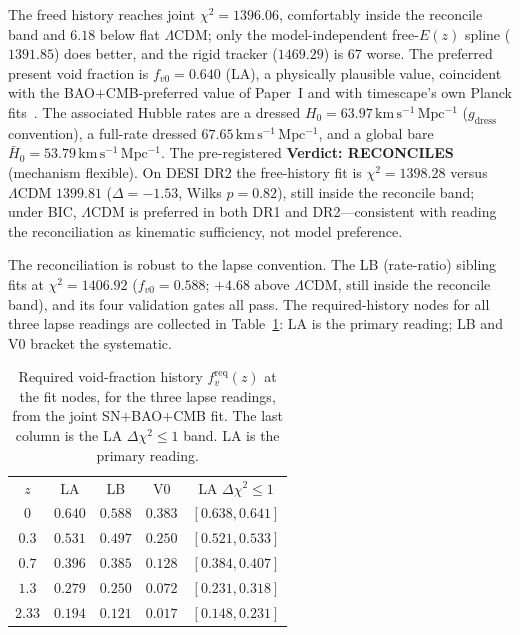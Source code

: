 \documentclass[aps,prd,twocolumn,nofootinbib,superscriptaddress,floatfix]{revtex4-2}
\newcommand{\Ho}{H_{0}}
\newcommand{\Hbaro}{\bar H_{0}}
\newcommand{\fvo}{f_{v0}}
\newcommand{\kmsmpc}{\,\mathrm{km\,s^{-1}\,Mpc^{-1}}}
\newcommand{\Lcdm}{\Lambda\mathrm{CDM}}
\newcommand{\gdress}{g_{\mathrm{dress}}}
\begin{document}
The freed history reaches joint $\chi^2=1396.06$, comfortably inside the
reconcile band and $6.18$ below flat $\Lcdm$; only the model-independent
free-$E(z)$ spline ($1391.85$) does better, and the rigid tracker ($1469.29$) is
$67$ worse. The preferred present void fraction is $\fvo=0.640$ (LA), a
physically plausible value, coincident with the BAO$+$CMB-preferred value of
Paper~I and with timescape's own Planck fits~\cite{Nazer2015}. The associated
Hubble rates are a dressed $\Ho=63.97\kmsmpc$ ($\gdress$ convention), a full-rate
dressed $67.65\kmsmpc$, and a global bare $\Hbaro=53.79\kmsmpc$. The
pre-registered \textbf{Verdict: RECONCILES} (mechanism flexible). On DESI DR2 the
free-history
fit is $\chi^2=1398.28$ versus $\Lcdm$ $1399.81$ ($\Delta=-1.53$, Wilks
$p=0.82$), still inside the reconcile band; under BIC, $\Lcdm$ is preferred in
both DR1 and DR2---consistent with reading the reconciliation as kinematic
sufficiency, not model preference.

The reconciliation is robust to the lapse convention. The LB (rate-ratio) sibling
fits at $\chi^2=1406.92$ ($\fvo=0.588$; $+4.68$ above $\Lcdm$, still inside the
reconcile band), and its four validation gates all pass. The required-history
nodes for all three lapse readings are collected in Table~\ref{tab:fvnodes}: LA is
the primary reading; LB and V0 bracket the systematic.

\begin{table}[t]
\caption{Required void-fraction history $f_v^{\mathrm{req}}(z)$ at the fit nodes,
for the three lapse readings, from the joint SN$+$BAO$+$CMB fit. The last column
is the LA $\Delta\chi^2\le1$ band. LA is the primary reading.}
\label{tab:fvnodes}
\begin{ruledtabular}
\begin{tabular}{ccccc}
$z$ & LA & LB & V0 & LA $\Delta\chi^2\!\le\!1$\\
\colrule
$0$    & $0.640$ & $0.588$ & $0.383$ & $[0.638,0.641]$\\
$0.3$  & $0.531$ & $0.497$ & $0.250$ & $[0.521,0.533]$\\
$0.7$  & $0.396$ & $0.385$ & $0.128$ & $[0.384,0.407]$\\
$1.3$  & $0.279$ & $0.250$ & $0.072$ & $[0.231,0.318]$\\
$2.33$ & $0.194$ & $0.121$ & $0.017$ & $[0.148,0.231]$\\
\end{tabular}
\end{ruledtabular}
\end{table}
\end{document}
